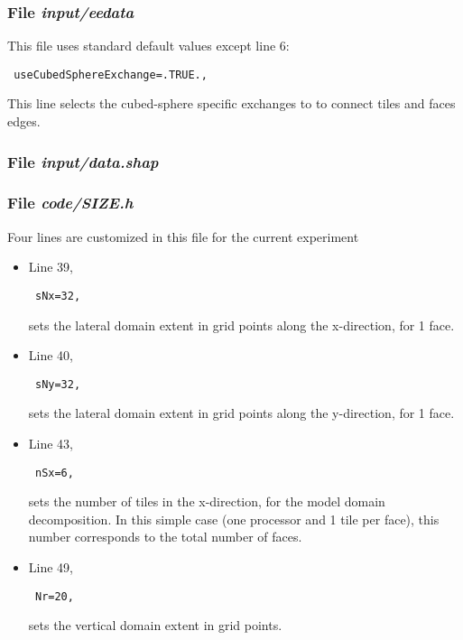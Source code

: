 \begin{small}

\end{small}

\subsubsection{File {\it input/eedata}}
\label{www:tutorials}

This file uses standard default values except line 6:
\begin{verbatim}
 useCubedSphereExchange=.TRUE.,
\end{verbatim}
This line selects the cubed-sphere specific exchanges to
to connect tiles and faces edges.

\subsubsection{File {\it input/data.shap}}
\label{www:tutorials}



\begin{small}

\end{small}

\subsubsection{File {\it code/SIZE.h}}
\label{www:tutorials}

Four lines are customized in this file for the current experiment

\begin{itemize}

\item Line 39, 
\begin{verbatim} sNx=32, \end{verbatim}
sets the lateral domain extent in grid points along the x-direction,
for 1 face.

\item Line 40,
\begin{verbatim} sNy=32, \end{verbatim} 
sets the lateral domain extent in grid points along the y-direction,
for 1 face.

\item Line 43,
\begin{verbatim} nSx=6, \end{verbatim} 
sets the number of tiles in the x-direction, for the model domain
decomposition. In this simple case (one processor and 1 tile per 
face), this number corresponds to the total number of faces.

\item Line 49, 
\begin{verbatim} Nr=20,   \end{verbatim} 
sets the vertical domain extent in grid points.

\end{itemize}

